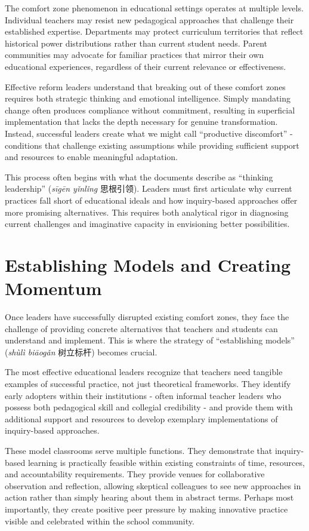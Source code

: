 \documentclass[
  Letterpaper,
]{scrbook}
\begin{document}
The comfort zone phenomenon in educational settings operates at multiple
levels. Individual teachers may resist new pedagogical approaches that
challenge their established expertise. Departments may protect
curriculum territories that reflect historical power distributions
rather than current student needs. Parent communities may advocate for
familiar practices that mirror their own educational experiences,
regardless of their current relevance or effectiveness.

Effective reform leaders understand that breaking out of these comfort
zones requires both strategic thinking and emotional intelligence.
Simply mandating change often produces compliance without commitment,
resulting in superficial implementation that lacks the depth necessary
for genuine transformation. Instead, successful leaders create what we
might call ``productive discomfort'' - conditions that challenge
existing assumptions while providing sufficient support and resources to
enable meaningful adaptation.

This process often begins with what the documents describe as ``thinking
leadership'' (\emph{sīgēn yǐnlǐng} 思根引领). Leaders must first
articulate why current practices fall short of educational ideals and
how inquiry-based approaches offer more promising alternatives. This
requires both analytical rigor in diagnosing current challenges and
imaginative capacity in envisioning better possibilities.

\section{Establishing Models and Creating
Momentum}\label{establishing-models-and-creating-momentum}

Once leaders have successfully disrupted existing comfort zones, they
face the challenge of providing concrete alternatives that teachers and
students can understand and implement. This is where the strategy of
``establishing models'' (\emph{shùlì biāogǎn} 树立标杆) becomes crucial.

The most effective educational leaders recognize that teachers need
tangible examples of successful practice, not just theoretical
frameworks. They identify early adopters within their institutions -
often informal teacher leaders who possess both pedagogical skill and
collegial credibility - and provide them with additional support and
resources to develop exemplary implementations of inquiry-based
approaches.

These model classrooms serve multiple functions. They demonstrate that
inquiry-based learning is practically feasible within existing
constraints of time, resources, and accountability requirements. They
provide venues for collaborative observation and reflection, allowing
skeptical colleagues to see new approaches in action rather than simply
hearing about them in abstract terms. Perhaps most importantly, they
create positive peer pressure by making innovative practice visible and
celebrated within the school community.
\end{document}
